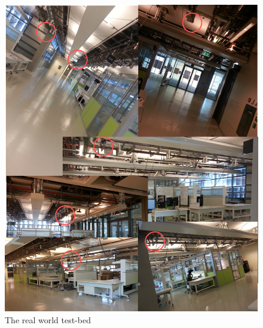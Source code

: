 \begin{figure} [!ht]
  \begin{center}
	  	\includegraphics[width=0.9\columnwidth]{./images/realworld.png}
  \end{center}
  \caption{The real world test-bed }\label{fig:tstbd}
\end{figure} 